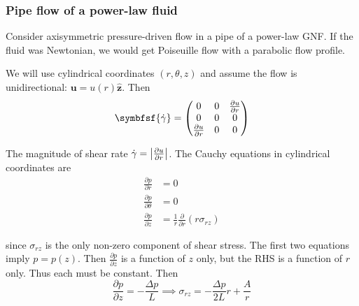 \documentclass{jknotes}
\begin{document}
\subsubsection{Pipe flow of a power-law fluid}
\label{sec:pipe}
Consider axisymmetric pressure-driven flow in a pipe of a power-law GNF. If
the fluid was Newtonian, we would get Poiseuille flow with a parabolic flow
profile.

\begin{center}
\end{center}

We will use cylindrical coordinates $(r,\theta,z)$ and assume the flow is
unidirectional: $\symbf{u} = u(r)\hat{\symbf{z}}$. Then
\begin{equation}
	\symbfsf{\srate} = \begin{pmatrix} 0 & 0 & \frac{\partial u}{\partial r} \\
	0 & 0 & 0 \\ \frac{\partial u}{\partial r} & 0 & 0 \end{pmatrix}
\end{equation}

The magnitude of shear rate $\dot{\gamma} = \abs{\frac{\partial u}{\partial r}}$.
The Cauchy equations in cylindrical coordinates are
\begin{equation}
	\begin{aligned}
		\frac{\partial p}{\partial r} &= 0 \\
		\frac{\partial p}{\partial \theta} &= 0 \\
		\frac{\partial p}{\partial z} &= \frac{1}{r} \frac{\partial}{\partial
		r} \left( r \sigma_{rz}\right)
	\end{aligned}
\end{equation}

since $\sigma_{rz}$ is the only non-zero component of shear stress. The first
two equations imply $p = p(z)$. Then $\frac{\partial p}{\partial z}$ is a
function of $z$ only, but the RHS is a function of $r$ only. Thus each
must be constant. Then
\begin{equation}
	\frac{\partial p}{\partial z} = -\frac{\Delta p}{L} \implies \sigma_{rz} =
	-\frac{\Delta p}{2L} r + \frac{A}{r}
\end{equation}
\end{document}
